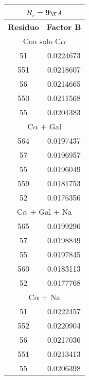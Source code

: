 \begin{tabular}[c]{|c|c|}
\multicolumn{2}{c}{$R_c=$9$\AA$}\\\hline
\textbf{Residuo}&\textbf{Factor B}\\\hline
\multicolumn{2}{c}{Con solo C$\alpha$}\\\hline
        51& 0.0224673\\
       551& 0.0218607\\
        56& 0.0214665\\
       550& 0.0211568\\
        55& 0.0204383\\\hline
\multicolumn{2}{c}{C$\alpha$ $+$ Gal}\\\hline
       564& 0.0197437\\
        57& 0.0196957\\
        55& 0.0196049\\
       559& 0.0181753\\
        52& 0.0176356\\\hline
\multicolumn{2}{c}{C$\alpha$ $+$ Gal $+$ Na}\\\hline
       565& 0.0199296\\
        57& 0.0198849\\
        55& 0.0197845\\
       560& 0.0183113\\
        52& 0.0177768\\\hline
\multicolumn{2}{c}{C$\alpha$ $+$ Na}\\\hline
        51& 0.0222457\\
       552& 0.0220904\\
        56& 0.0217036\\
       551& 0.0213413\\
        55& 0.0206398\\\hline
\end{tabular}
